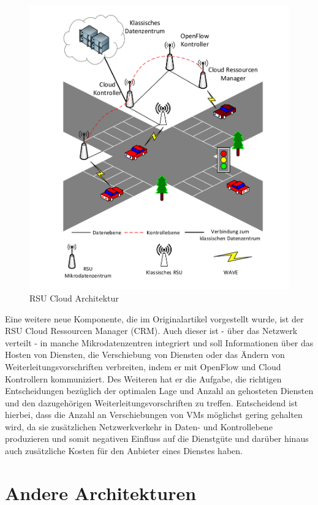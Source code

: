 \documentclass[conference]{IEEEtran}
\begin{document}
\begin{figure}[h!]
	\centering
	\includegraphics[trim=1.5cm 6 0 0.8cm, scale=0.66]{grafik/strasse.pdf}
	\caption{RSU Cloud Architektur}
	\label{img:grafik-dummy}
\end{figure}

Eine weitere neue Komponente, die im Originalartikel vorgestellt wurde, ist der RSU Cloud Ressourcen Manager (CRM). Auch dieser ist - über das Netzwerk verteilt - in manche Mikrodatenzentren integriert und soll Informationen über das Hosten von Diensten, die Verschiebung von Diensten oder das Ändern von Weiterleitungsvorschriften verbreiten, indem er mit OpenFlow und Cloud Kontrollern kommuniziert. Des Weiteren hat er die Aufgabe, die richtigen Entscheidungen bezüglich der optimalen Lage und Anzahl an gehosteten Diensten und den dazugehörigen Weiterleitungsvorschriften zu treffen. Entscheidend ist hierbei, dass die Anzahl an Verschiebungen von VMs möglichst gering gehalten wird, da sie zusätzlichen Netzwerkverkehr in Daten- und Kontrollebene produzieren und somit negativen Einfluss auf die Dienstgüte und darüber hinaus auch zusätzliche Kosten für den Anbieter eines Dienstes haben.



\section{Andere Architekturen}
\end{document}

